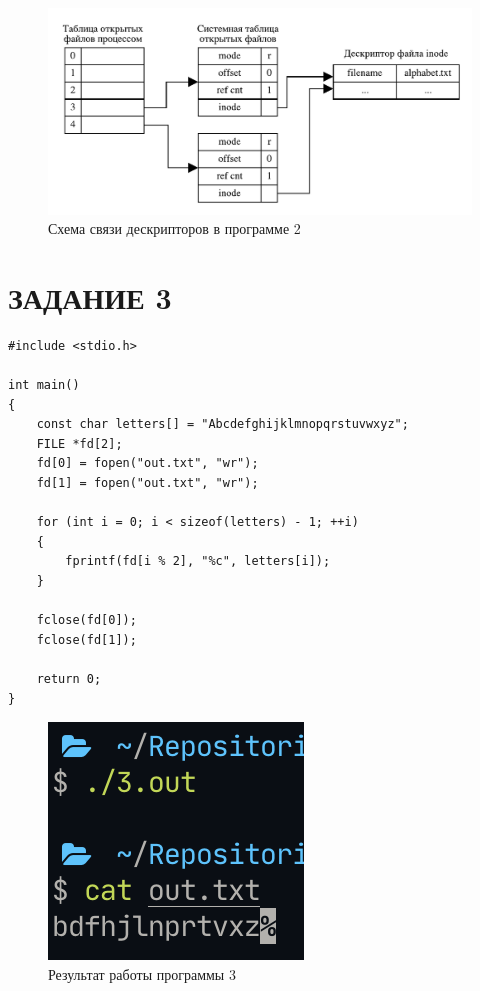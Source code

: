 \begin{figure}[H]
    \centering
    \includegraphics[scale=0.8]{img/2.pdf}
    \caption{Схема связи дескрипторов в программе 2}
\end{figure}

\section{ЗАДАНИЕ 3}

\begin{lstlisting}[caption=Текст программы задания 3]
#include <stdio.h>

int main()
{
    const char letters[] = "Abcdefghijklmnopqrstuvwxyz";
    FILE *fd[2];
    fd[0] = fopen("out.txt", "wr");
    fd[1] = fopen("out.txt", "wr");

    for (int i = 0; i < sizeof(letters) - 1; ++i)
    {
        fprintf(fd[i % 2], "%c", letters[i]);
    }

    fclose(fd[0]);
    fclose(fd[1]);

    return 0;
}
\end{lstlisting}

\begin{figure}[H]
    \centering
    \includegraphics[scale=1.3]{img/3.png}
    \caption{Результат работы программы 3}
\end{figure}

